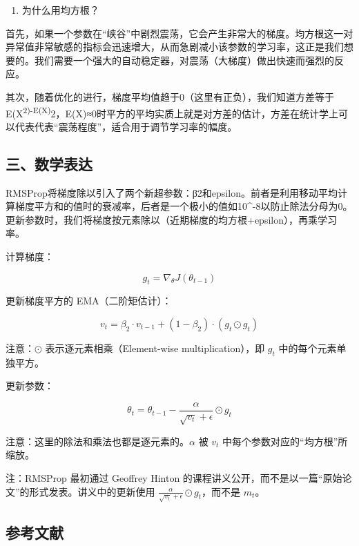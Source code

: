 \begin{enumerate}
\def\labelenumi{\arabic{enumi}.}
\setcounter{enumi}{1}
\tightlist
\item
  为什么用均方根？
\end{enumerate}

首先，如果一个参数在``峡谷''中剧烈震荡，它会产生非常大的梯度。均方根这一对异常值非常敏感的指标会迅速增大，从而急剧减小该参数的学习率，这正是我们想要的。我们需要一个强大的自动稳定器，对震荡（大梯度）做出快速而强烈的反应。

其次，随着优化的进行，梯度平均值趋于0（这里有正负），我们知道方差等于E(X\textsuperscript{2)-E(X)}2，E(X)≈0时平方的平均实质上就是对方差的估计，方差在统计学上可以代表代表``震荡程度''，适合用于调节学习率的幅度。

\hypertarget{ux4e09ux6570ux5b66ux8868ux8fbe-1}{%
\subsection{三、数学表达}\label{ux4e09ux6570ux5b66ux8868ux8fbe-1}}

RMSProp将梯度除以引入了两个新超参数：β2和epsilon。前者是利用移动平均计算梯度平方和的值时的衰减率，后者是一个极小的值如10\^{}-8以防止除法分母为0。更新参数时，我们将梯度按元素除以（近期梯度的均方根+epsilon），再乘学习率。

计算梯度：

\[
g_t = \nabla_\theta J(\theta_{t-1})
\]

更新梯度平方的 EMA（二阶矩估计）：

\[
v_t = \beta_2 \cdot v_{t-1} + (1-\beta_2)\cdot (g_t \odot g_t)
\]

注意：\(\odot\) 表示逐元素相乘（Element-wise multiplication），即 \(g_t\) 中的每个元素单独平方。

更新参数：

\[
\theta_t = \theta_{t-1} - \frac{\alpha}{\sqrt{v_t}+\epsilon}\odot g_t
\]

注意：这里的除法和乘法也都是逐元素的。\(\alpha\) 被 \(v_t\) 中每个参数对应的``均方根''所缩放。

注：RMSProp 最初通过 Geoffrey Hinton 的课程讲义公开，而不是以一篇``原始论文''的形式发表。讲义中的更新使用 \(\frac{\alpha}{\sqrt{v_t}+\epsilon}\odot g_t\)，而不是 \(m_t\)。

\hypertarget{ux53c2ux8003ux6587ux732e-27}{%
\subsection{参考文献}\label{ux53c2ux8003ux6587ux732e-27}}

